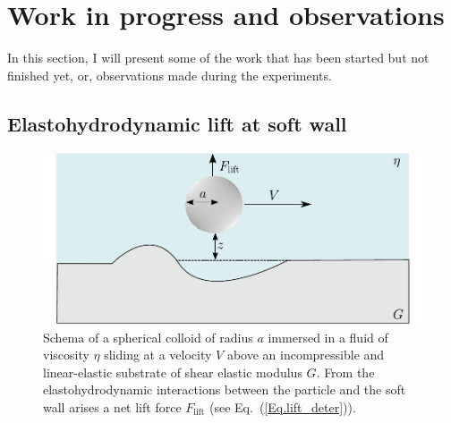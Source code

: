 \section{Work in progress and observations}

In this section, I will present some of the work that has been started but not finished yet, or, observations made during the experiments.

\subsection{Elastohydrodynamic lift at soft wall}

\begin{figure}[H]
	\centering
	\includegraphics{02_body/chapter4/images/EHD_forces/drawing_system.pdf}
	\caption{Schema of a spherical colloid of radius $a$  immersed in a fluid of viscosity $\eta$ sliding at a velocity $V$ above an incompressible and linear-elastic substrate of shear elastic modulus $G$. From the elastohydrodynamic interactions between the particle and the soft wall arises a net lift force $F_\mathrm{lift}$ (see Eq.~(\ref{Eq.lift_deter})).}
	\label{fig.shema_EHD}
\end{figure}



